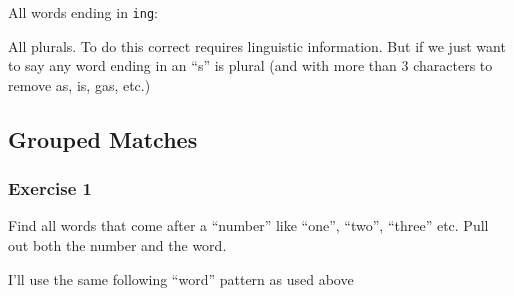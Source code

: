 \documentclass[]{book}
\newenvironment{Shaded}{\begin{snugshade}}{\end{snugshade}}
\newcommand{\CharTok}[1]{\textcolor[rgb]{0.31,0.60,0.02}{#1}}
\newcommand{\CommentTok}[1]{\textcolor[rgb]{0.56,0.35,0.01}{\textit{#1}}}
\newcommand{\KeywordTok}[1]{\textcolor[rgb]{0.13,0.29,0.53}{\textbf{#1}}}
\newcommand{\NormalTok}[1]{#1}
\newcommand{\OperatorTok}[1]{\textcolor[rgb]{0.81,0.36,0.00}{\textbf{#1}}}
\newcommand{\StringTok}[1]{\textcolor[rgb]{0.31,0.60,0.02}{#1}}
\theoremstyle{definition}
\theoremstyle{definition}
\theoremstyle{definition}
\theoremstyle{remark}
\begin{document}
All words ending in \texttt{ing}:

\begin{Shaded}
\end{Shaded}

All plurals. To do this correct requires linguistic information. But if
we just want to say any word ending in an ``s'' is plural (and with more
than 3 characters to remove as, is, gas, etc.)

\begin{Shaded}
\end{Shaded}

\hypertarget{grouped-matches}{%
\subsection{Grouped Matches}\label{grouped-matches}}

\hypertarget{exercise-1-33}{%
\subsubsection{Exercise 1}\label{exercise-1-33}}

Find all words that come after a ``number'' like ``one'', ``two'',
``three'' etc. Pull out both the number and the word.

I'll use the same following ``word'' pattern as used above
\end{document}
